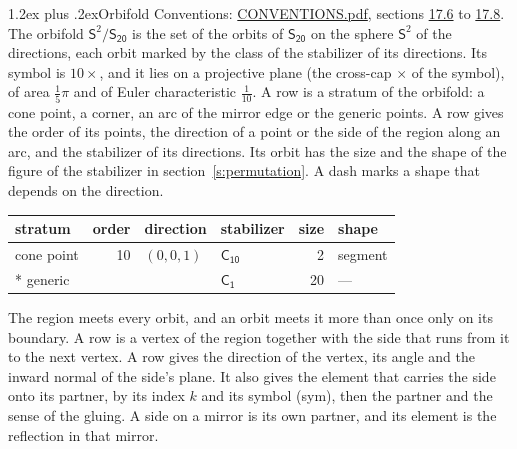 \documentclass[10pt,a4paper]{article}
\makeatletter
\renewcommand\section{\@startsection{section}{1}{\z@}{-3ex plus -1ex minus -.2ex}%
  {1.2ex plus .2ex}{\normalfont\large\sffamily\bfseries\color{parttitle}}}
\numberwithin{equation}{section}
\newcommand{\grp}[1]{\mathsf{#1}}
\newcommand{\orbname}[1]{#1}
\newcommand{\dirvec}[3]{(#1, #2, #3)}
\newcommand{\twosphere}{\mathsf{S}^{2}}
\makeatother
\begin{document}
\section{Orbifold}\label{s:orbifold}
Conventions: \href{../../CONVENTIONS.pdf}{CONVENTIONS.pdf}, sections \href{../../CONVENTIONS.pdf\#conv.17.6}{17.6} to \href{../../CONVENTIONS.pdf\#conv.17.8}{17.8}.
The orbifold $\twosphere/\grp{S_{20}}$ is the set of the orbits of $\grp{S_{20}}$ on the sphere $\twosphere$ of the directions, each orbit marked by the class of the stabilizer of its directions. Its symbol is $\orbname{10{\times}}$, and it lies on a projective plane (the cross-cap ${\times}$ of the symbol), of area $\tfrac{1}{5}\pi$ and of Euler characteristic $\tfrac{1}{10}$.
\leavevmode\label{n:head.stratum}\label{n:head.order.point}\label{n:head.direction}\label{n:head.stabilizer}\label{n:head.size.orbit}\label{n:head.shape}A row is a stratum of the orbifold: a cone point, a corner, an arc of the mirror edge or the generic points. A row gives the order of its points, the direction of a point or the side of the region along an arc, and the stabilizer of its directions. Its orbit has the size and the shape of the figure of the stabilizer in section~\ref{s:permutation}. A dash marks a shape that depends on the direction.
{\small\setlength{\tabcolsep}{4pt}\begin{longtable}{@{}lrllrl@{}}\toprule
stratum & order & direction & stabilizer & size & shape\\\midrule\endhead
\bottomrule\endfoot\endlastfoot
cone point & 10 & $\dirvec{0}{0}{1}$ & \href{C10.pdf}{$\grp{C_{10}}$} & 2 & segment\\*
generic &  &  & \href{C1.pdf}{$\grp{C_{1}}$} & 20 & ---\\
\bottomrule\end{longtable}}
\leavevmode\label{n:head.vertex.region}\label{n:head.angle}\label{n:head.normal.side}\label{n:head.partner}\label{n:head.sense}The region meets every orbit, and an orbit meets it more than once only on its boundary. A row is a vertex of the region together with the side that runs from it to the next vertex. A row gives the direction of the vertex, its angle and the inward normal of the side's plane. It also gives the element that carries the side onto its partner, by its index $k$ and its symbol (sym), then the partner and the sense of the gluing. A side on a mirror is its own partner, and its element is the reflection in that mirror.
\end{document}
